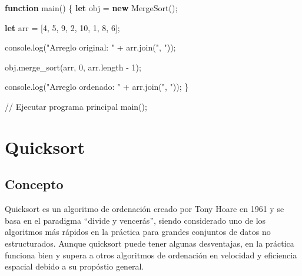 \documentclass[
  spanish,
  letterpaper,
  DIV=11,
  numbers=noendperiod]{scrreprt}
\newenvironment{Shaded}{\begin{snugshade}}{\end{snugshade}}
\newcommand{\AttributeTok}[1]{\textcolor[rgb]{0.40,0.45,0.13}{#1}}
\newcommand{\BuiltInTok}[1]{\textcolor[rgb]{0.00,0.23,0.31}{#1}}
\newcommand{\CommentTok}[1]{\textcolor[rgb]{0.37,0.37,0.37}{#1}}
\newcommand{\DecValTok}[1]{\textcolor[rgb]{0.68,0.00,0.00}{#1}}
\newcommand{\FunctionTok}[1]{\textcolor[rgb]{0.28,0.35,0.67}{#1}}
\newcommand{\KeywordTok}[1]{\textcolor[rgb]{0.00,0.23,0.31}{\textbf{#1}}}
\newcommand{\NormalTok}[1]{\textcolor[rgb]{0.00,0.23,0.31}{#1}}
\newcommand{\OperatorTok}[1]{\textcolor[rgb]{0.37,0.37,0.37}{#1}}
\newcommand{\StringTok}[1]{\textcolor[rgb]{0.13,0.47,0.30}{#1}}
\begin{document}
\begin{Shaded}
\begin{Highlighting}[]
\KeywordTok{function} \FunctionTok{main}\NormalTok{() \{}
    \KeywordTok{let}\NormalTok{ obj }\OperatorTok{=} \KeywordTok{new} \FunctionTok{MergeSort}\NormalTok{()}\OperatorTok{;}

    \KeywordTok{let}\NormalTok{ arr }\OperatorTok{=}\NormalTok{ [}\DecValTok{4}\OperatorTok{,} \DecValTok{5}\OperatorTok{,} \DecValTok{9}\OperatorTok{,} \DecValTok{2}\OperatorTok{,} \DecValTok{10}\OperatorTok{,} \DecValTok{1}\OperatorTok{,} \DecValTok{8}\OperatorTok{,} \DecValTok{6}\NormalTok{]}\OperatorTok{;}

    \BuiltInTok{console}\OperatorTok{.}\FunctionTok{log}\NormalTok{(}\StringTok{"Arreglo original: "} \OperatorTok{+}\NormalTok{ arr}\OperatorTok{.}\FunctionTok{join}\NormalTok{(}\StringTok{", "}\NormalTok{))}\OperatorTok{;}

\NormalTok{    obj}\OperatorTok{.}\FunctionTok{merge\_sort}\NormalTok{(arr}\OperatorTok{,} \DecValTok{0}\OperatorTok{,}\NormalTok{ arr}\OperatorTok{.}\AttributeTok{length} \OperatorTok{{-}} \DecValTok{1}\NormalTok{)}\OperatorTok{;}

    \BuiltInTok{console}\OperatorTok{.}\FunctionTok{log}\NormalTok{(}\StringTok{"Arreglo ordenado: "} \OperatorTok{+}\NormalTok{ arr}\OperatorTok{.}\FunctionTok{join}\NormalTok{(}\StringTok{", "}\NormalTok{))}\OperatorTok{;}
\NormalTok{\}}

\CommentTok{// Ejecutar programa principal}
\FunctionTok{main}\NormalTok{()}\OperatorTok{;}
\end{Highlighting}
\end{Shaded}

\section{Quicksort}\label{quicksort}

\subsection{Concepto}\label{concepto-3}

Quicksort es un algoritmo de ordenación creado por Tony Hoare en 1961 y
se basa en el paradigma ``divide y vencerás'', siendo considerado uno de
los algoritmos más rápidos en la práctica para grandes conjuntos de
datos no estructurados. Aunque quicksort puede tener algunas
desventajas, en la práctica funciona bien y supera a otros algoritmos de
ordenación en velocidad y eficiencia espacial debido a su propóstio
general.
\end{document}
